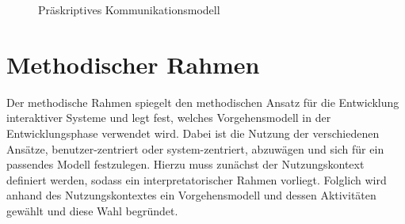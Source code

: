 \documentclass[a4paper,11pt]{article}%
\renewcommand{\\}{\vspace*{0.5\baselineskip} \newline}
\begin{document}
\begin{figure}[H]
	\centering
	\setlength{\fboxsep}{1pt}
	\setlength{\fboxrule}{1pt}
	\captionsetup{justification=centering}
	\caption{Präskriptives Kommunikationsmodell}
	\label{img:präskriptiv}
\end{figure}


\newpage

\section{Methodischer Rahmen}
	Der methodische Rahmen spiegelt den methodischen Ansatz für die Entwicklung interaktiver Systeme und legt fest, welches Vorgehensmodell in der Entwicklungsphase verwendet wird. Dabei ist die Nutzung der verschiedenen Ansätze, benutzer-zentriert oder system-zentriert, abzuwägen und sich für ein passendes Modell festzulegen. Hierzu muss zunächst der Nutzungskontext definiert werden, sodass ein interpretatorischer Rahmen vorliegt. Folglich wird anhand des Nutzungskontextes ein Vorgehensmodell und dessen Aktivitäten gewählt und diese Wahl begründet.
\end{document}
